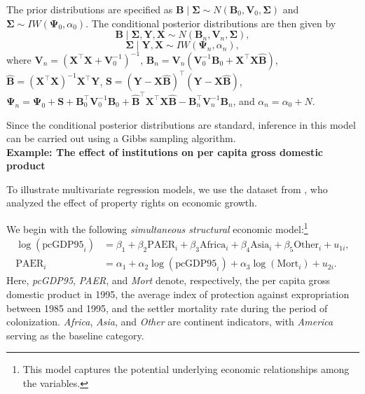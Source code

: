 The prior distributions are specified as $\bm{B} \mid \bm{\Sigma} \sim N(\bm{B}_0, \bm{V}_0, \bm{\Sigma})$ and $\bm{\Sigma} \sim IW(\bm{\Psi}_0, \alpha_0)$. The conditional posterior distributions are then given by
\begin{equation*}
	\bm{B} \mid \bm{\Sigma}, \bm{Y}, \bm{X} \sim N(\bm{B}_n, \bm{V}_n, \bm{\Sigma}),
\end{equation*}
\begin{equation*}
	\bm{\Sigma} \mid \bm{Y}, \bm{X} \sim IW(\bm{\Psi}_n, \alpha_n),
\end{equation*}
where $\bm{V}_n = (\bm{X}^{\top}\bm{X} + \bm{V}_0^{-1})^{-1}$, $\bm{B}_n = \bm{V}_n(\bm{V}_0^{-1}\bm{B}_0 + \bm{X}^{\top}\bm{X}\hat{\bm{B}})$, $\hat{\bm{B}} = (\bm{X}^{\top}\bm{X})^{-1}\bm{X}^{\top}\bm{Y}$, ${\bm{S}} = (\bm{Y} - \bm{X}\hat{\bm{B}})^{\top}(\bm{Y} - \bm{X}\hat{\bm{B}})$, $\bm{\Psi}_n = \bm{\Psi}_0 + \bm{S} + \bm{B}_0^{\top}\bm{V}_0^{-1}\bm{B}_0 + \hat{\bm{B}}^{\top}\bm{X}^{\top}\bm{X}\hat{\bm{B}} - \bm{B}_n^{\top}\bm{V}_n^{-1}\bm{B}_n$, and $\alpha_n = \alpha_0 + N$.

Since the conditional posterior distributions are standard, inference in this model can be carried out using a Gibbs sampling algorithm.\\

\textbf{Example: The effect of institutions on per capita gross domestic product}

To illustrate multivariate regression models, we use the dataset from \cite{Acemoglu2001}, who analyzed the effect of property rights on economic growth.

We begin with the following \textit{simultaneous structural} economic model:\footnote{This model captures the potential underlying economic relationships among the variables.}
\begin{align}\label{eq:str1}
	\log(\text{pcGDP95}_i) &= \beta_1 + \beta_2 \text{PAER}_i + \beta_3 \text{Africa}_i + \beta_4 \text{Asia}_i + \beta_5 \text{Other}_i + u_{1i},\\
	\text{PAER}_i &= \alpha_1 + \alpha_2 \log(\text{pcGDP95}_i) + \alpha_3 \log(\text{Mort}_i) + u_{2i}. \label{eq:str2}
\end{align}
Here, \textit{pcGDP95}, \textit{PAER}, and \textit{Mort} denote, respectively, the per capita gross domestic product in 1995, the average index of protection against expropriation between 1985 and 1995, and the settler mortality rate during the period of colonization. \textit{Africa}, \textit{Asia}, and \textit{Other} are continent indicators, with \textit{America} serving as the baseline category.

